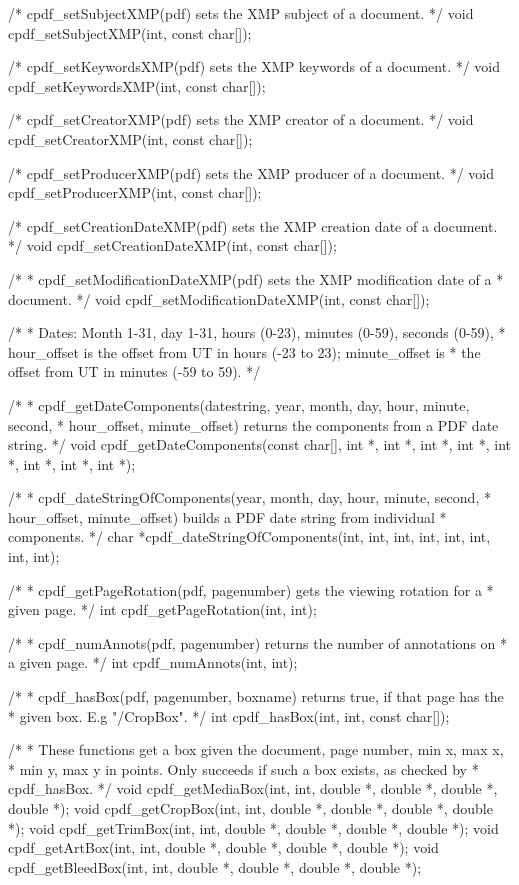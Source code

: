 /* cpdf_setSubjectXMP(pdf) sets the XMP subject of a document. */
void cpdf_setSubjectXMP(int, const char[]);

/* cpdf_setKeywordsXMP(pdf) sets the XMP keywords of a document. */
void cpdf_setKeywordsXMP(int, const char[]);

/* cpdf_setCreatorXMP(pdf) sets the XMP creator of a document. */
void cpdf_setCreatorXMP(int, const char[]);

/* cpdf_setProducerXMP(pdf) sets the XMP producer of a document. */
void cpdf_setProducerXMP(int, const char[]);

/* cpdf_setCreationDateXMP(pdf) sets the XMP creation date of a document. */
void cpdf_setCreationDateXMP(int, const char[]);

/*
 * cpdf_setModificationDateXMP(pdf) sets the XMP modification date of a
 * document.
 */
void cpdf_setModificationDateXMP(int, const char[]);

/*
 * Dates: Month 1-31, day 1-31, hours (0-23), minutes (0-59), seconds (0-59),
 * hour_offset is the offset from UT in hours (-23 to 23); minute_offset is
 * the offset from UT in minutes (-59 to 59).
 */

/*
 * cpdf_getDateComponents(datestring, year, month, day, hour, minute, second,
 * hour_offset, minute_offset) returns the components from a PDF date string.
 */
void cpdf_getDateComponents(const char[], int *, int *, int *, int *, int *,
                            int *, int *, int *);

/*
 * cpdf_dateStringOfComponents(year, month, day, hour, minute, second,
 * hour_offset, minute_offset) builds a PDF date string from individual
 * components.
 */
char *cpdf_dateStringOfComponents(int, int, int, int, int, int, int, int);

/*
 * cpdf_getPageRotation(pdf, pagenumber) gets the viewing rotation for a
 * given page.
 */
int cpdf_getPageRotation(int, int);

/*
 * cpdf_numAnnots(pdf, pagenumber) returns the number of annotations on
 * a given page.
 */
int cpdf_numAnnots(int, int);

/*
 * cpdf_hasBox(pdf, pagenumber, boxname) returns true, if that page has the
 * given box. E.g "/CropBox".
 */
int cpdf_hasBox(int, int, const char[]);

/*
 * These functions get a box given the document, page number, min x, max x,
 * min y, max y in points. Only succeeds if such a box exists, as checked by
 * cpdf_hasBox.
 */
void cpdf_getMediaBox(int, int, double *, double *, double *, double *);
void cpdf_getCropBox(int, int, double *, double *, double *, double *);
void cpdf_getTrimBox(int, int, double *, double *, double *, double *);
void cpdf_getArtBox(int, int, double *, double *, double *, double *);
void cpdf_getBleedBox(int, int, double *, double *, double *, double *);

